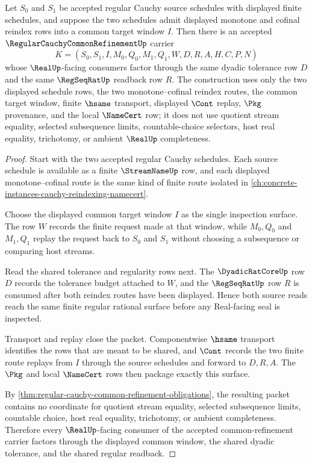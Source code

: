 \begin{theorem}
\label{thm:regular-cauchy-common-refinement}
Let $S_0$ and $S_1$ be accepted regular Cauchy source schedules with displayed finite schedules, and suppose the two schedules admit displayed monotone and cofinal reindex rows into a common target window $I$. Then there is an accepted $\RegularCauchyCommonRefinementUp$ carrier
$$
K=(S_0,S_1,I,M_0,Q_0,M_1,Q_1,W,D,R,A,H,C,P,N)
$$
whose $\RealUp$-facing consumers factor through the same dyadic tolerance row $D$ and the same $\RegSeqRatUp$ readback row $R$. The construction uses only the two displayed schedule rows, the two monotone--cofinal reindex routes, the common target window, finite $\hsame$ transport, displayed $\Cont$ replay, $\Pkg$ provenance, and the local $\NameCert$ row; it does not use quotient stream equality, selected subsequence limits, countable-choice selectors, host real equality, trichotomy, or ambient $\RealUp$ completeness.
\end{theorem}
\begin{proof}
Start with the two accepted regular Cauchy schedules. Each source schedule is available as a finite $\StreamNameUp$ row, and each displayed monotone--cofinal route is the same kind of finite route isolated in \autoref{ch:concrete-instances-cauchy-reindexing-namecert}.

Choose the displayed common target window $I$ as the single inspection surface. The row $W$ records the finite request made at that window, while $M_0,Q_0$ and $M_1,Q_1$ replay the request back to $S_0$ and $S_1$ without choosing a subsequence or comparing host streams.

Read the shared tolerance and regularity rows next. The $\DyadicRatCoreUp$ row $D$ records the tolerance budget attached to $W$, and the $\RegSeqRatUp$ row $R$ is consumed after both reindex routes have been displayed. Hence both source reads reach the same finite regular rational surface before any Real-facing seal is inspected.

Transport and replay close the packet. Componentwise $\hsame$ transport identifies the rows that are meant to be shared, and $\Cont$ records the two finite route replays from $I$ through the source schedules and forward to $D,R,A$. The $\Pkg$ and local $\NameCert$ rows then package exactly this surface.

By \autoref{thm:regular-cauchy-common-refinement-obligations}, the resulting packet contains no coordinate for quotient stream equality, selected subsequence limits, countable choice, host real equality, trichotomy, or ambient completeness. Therefore every $\RealUp$-facing consumer of the accepted common-refinement carrier factors through the displayed common window, the shared dyadic tolerance, and the shared regular readback.
\end{proof}


